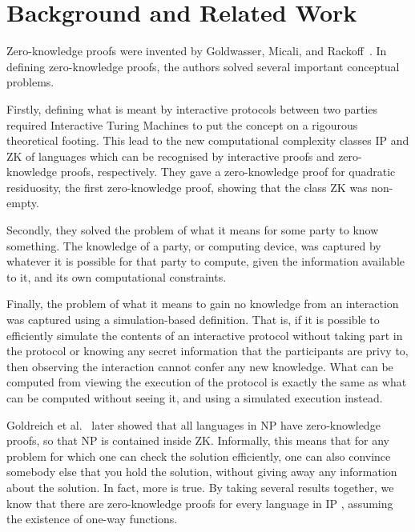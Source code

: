 \chapter{Background and Related Work}
\label{chapterlabel:RelatedWork}

Zero-knowledge proofs were invented by Goldwasser, Micali, and Rackoff~\cite{GoldwasserMR85}. In defining zero-knowledge proofs, the authors solved several important conceptual problems.

Firstly, defining what is meant by interactive protocols between two parties required Interactive Turing Machines to put the concept on a rigourous theoretical footing. This lead to the new computational complexity classes \textsf{IP} and \textsf{ZK} of languages which can be recognised by interactive proofs and zero-knowledge proofs, respectively. They gave a zero-knowledge proof for quadratic residuosity, the first zero-knowledge proof, showing that the class \textsf{ZK} was non-empty.

Secondly, they solved the problem of what it means for some party to know something. The knowledge of a party, or computing device, was captured by whatever it is possible for that party to compute, given the information available to it, and its own computational constraints.

Finally, the problem of what it means to gain no knowledge from an interaction was captured using a simulation-based definition. That is, if it is possible to efficiently simulate the contents of an interactive protocol without taking part in the protocol or knowing any secret information that the participants are privy to, then observing the interaction cannot confer any new knowledge. What can be computed from viewing the execution of the protocol is exactly the same as what can be computed without seeing it, and using a simulated execution instead.

Goldreich et al.~\cite{GMWzk} later showed that all languages in \textsf{NP} have zero-knowledge proofs, so that \textsf{NP} is contained inside \textsf{ZK}. Informally, this means that for any problem for which one can check the solution efficiently, one can also convince somebody else that you hold the solution, without giving away any information about the solution. In fact, more is true. By taking several results together, we know that there are zero-knowledge proofs for every language in \textsf{IP} \cite{GoldreichMW86,ImpagliazzoY87,Shamir90}, assuming the existence of one-way functions.

